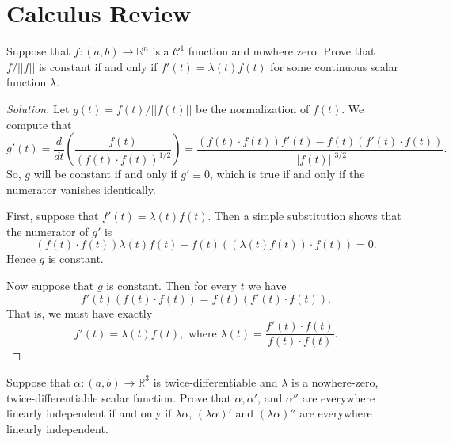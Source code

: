 \documentclass[Shifrin_Solutions_Spring_2018]{subfiles}
\begin{document}
\section{Calculus Review}

\begin{exercise}
Suppose that $f:(a,b) \rightarrow \mathbb{R}^n$ is a $\mathcal{C}^1$ function and nowhere zero. Prove that $f / ||f|| $ is constant if and only if $f'(t) = \lambda(t) f(t)$ for some continuous scalar function $\lambda$.
\end{exercise}

\begin{proof}[Solution]
Let $g(t) = f(t) / ||f(t)||$ be the normalization of $f(t)$. We compute that
\[
g'(t) = \dfrac{d}{dt} \left( \dfrac{f(t)}{ ( f(t) \cdot f(t) )^{1/2} }\right) = \dfrac{(f(t)\cdot f(t) ) f'(t) - f(t) ( f'(t) \cdot f(t) )}{||f(t)||^{3/2}} .
\]
So, $g$ will be constant if and only if $g' \equiv 0$, which is true if and only if the numerator vanishes identically.

First, suppose that $f'(t) =\lambda(t) f(t)$. Then a simple substitution shows that the numerator of $g'$ is
\[
(f(t)\cdot f(t) ) \lambda(t)f(t) - f(t) ( (\lambda(t)f(t)) \cdot f(t) ) = 0.
\]
Hence $g$ is constant.

Now suppose that $g$ is constant. Then for every $t$ we have
\[
f'(t) (f(t)\cdot f(t) ) =  f(t) (f'(t) \cdot f(t) ) .
\]
That is, we must have exactly
\[
f'(t) = \lambda(t) f(t) , \text{ where } \lambda(t) = \dfrac{f'(t)\cdot f(t)}{f(t)\cdot f(t)} .
\]
\end{proof}

\vspace{1cm}



\begin{exercise}
Suppose that $\alpha: (a,b) \rightarrow \mathbb{R}^3$ is twice-differentiable and $\lambda$ is a nowhere-zero, twice-differentiable scalar function. Prove that $\alpha, \alpha'$, and $\alpha''$ are everywhere linearly independent if and only if $\lambda\alpha$, $(\lambda \alpha)'$ and $(\lambda \alpha)''$ are everywhere linearly independent.
\end{exercise}
\end{document}
